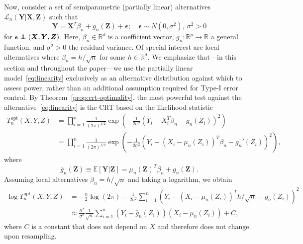 \documentclass[12pt]{article}
\theoremstyle{definition}
\theoremstyle{remark}
\def\independenT#1#2{\mathrel{\rlap{$#1#2$}\mkern2mu{#1#2}}}
\newcommand\independent{\protect\mathpalette{\protect\independenT}{\perp}}
\newcommand{\prx}{\bm X}
\newcommand{\srx}{X}
\newcommand{\prz}{\bm Z}
\newcommand{\srz}{Z}
\newcommand{\pry}{{\bm Y}}
\newcommand{\sry}{Y}
\newcommand{\peps}{\bm \epsilon}
\begin{document}
Now, consider a set of semiparametric (partially linear) alternatives $\mathcal L_n(\pry|\prx,\prz)$ such that
\begin{equation}
	\pry = \prx^T \beta_n + g_n(\prz) + \peps; \quad \peps \sim N(0, \sigma^2 ),\ \sigma^2 > 0
	\label{eq:linearity}
\end{equation}
for $\peps \independent (\prx, \pry, \prz)$. Here, $\beta_n \in \mathbb R^d$ is a coefficient vector, $g_n: \mathbb R^p \rightarrow \mathbb R$ a general function, and $\sigma^2 > 0$ the residual variance. Of special interest are local alternatives where $\beta_n = h/\sqrt{n}$ for some $h \in \mathbb R^d$. We emphasize that---in this section and throughout the paper---we use the partially linear model~\eqref{eq:linearity} exclusively as an alternative distribution against which to assess power, rather than an additional assumption required for Type-I error control. By Theorem~\ref{prop:crt-optimality}, the most powerful test against the alternative~\eqref{eq:linearity} is the CRT based on the likelihood statistic 
\begin{equation}
\begin{split}
T_n^{\text{opt}}(\srx, \sry, \srz) &= \prod_{i = 1}^n\frac{1}{(2\pi)^{1/2}}\exp\left(-\frac{1}{2\sigma^2}\left(\sry_i - \srx_i^T \beta_n - g_n(\srz_i)\right)^2\right) \\
&=\prod_{i = 1}^n\frac{1}{(2\pi)^{1/2}}\exp\left(-\frac{1}{2\sigma^2}\left(\sry_i - (\srx_i-\mu_n(\srz_i))^T \beta_n - g_n'(\srz_i)\right)^2\right),
\label{eq:likelihood-ratio}
\end{split}
\end{equation}
where
\begin{equation}
\bar g_n(\prz) \equiv \mathbb E[\pry|\prz] =  \mu_n(\prz)^T\beta_n  + g_n(\prz).
\label{eq:g-n-prime-def}
\end{equation}
Assuming local alternatives $\beta_n = h/\sqrt n$ and taking a logarithm, we obtain
\begin{equation}
	\begin{split}
		\log T_n^{\text{opt}}(\srx, \sry, \srz) &= -\frac n 2 \log(2\pi) - \frac{1}{2\sigma^2}\sum_{i = 1}^n\left(\sry_i - (\srx_i-\mu_n(\srz_i))^T h/\sqrt{n} - \bar g_n(\srz_i)\right)^2 \\
		&\approx   \frac{h^T}{\sigma^2}\frac{1}{\sqrt{n}}\sum_{i = 1}^n(\sry_i - \bar g_n(\srz_i))(\srx_i-\mu_n(\srz_i)) + C,
	\end{split}
\label{eq:optimal-semiparametric}
\end{equation}
where $C$ is a constant that does not depend on $\srx$ and therefore does not change upon resampling. 
\end{document}

